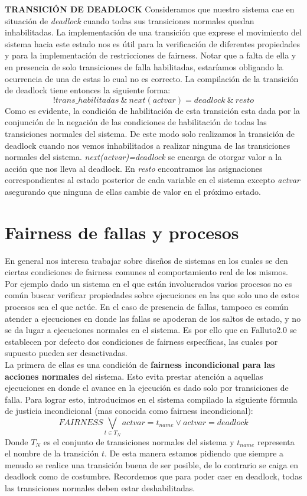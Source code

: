 \documentclass[titlepage, 12pt]{book}
\begin{document}
\textbf{TRANSICI\'ON DE DEADLOCK}
Consideramos que nuestro sistema cae en situaci\'on de \textit{deadlock} cuando todas sus transiciones normales quedan inhabilitadas. La implementaci\'on de una transici\'on que exprese el movimiento del sistema hacia este estado nos es \'util para la verificaci\'on de diferentes propiedades y para la implementaci\'on de restricciones de fairness. Notar que a falta de ella y en presencia de solo transiciones de falla habilitadas, estar\'iamos obligando la ocurrencia de una de estas lo cual no es correcto. La compilaci\'on de la transici\'on de deadlock tiene entonces la siguiente forma:
$$!trans\_habilitadas~\&~next(actvar)=deadlock~\&~resto$$
Como es evidente, la condici\'on de habilitaci\'on de esta transici\'on esta dada por la conjunci\'on de la negaci\'on de las condiciones de habilitaci\'on de todas las transiciones normales del sistema. De este modo solo realizamos la transici\'on de deadlock cuando nos vemos inhabilitados a realizar ninguna de las transiciones normales del sistema. \textit{next(actvar)=deadlock} se encarga de otorgar valor a la acci\'on que nos lleva al deadlock. En \textit{resto} encontramos las asignaciones correspondientes al estado posterior de cada variable en el sistema excepto \textit{actvar} asegurando que ninguna de ellas cambie de valor en el pr\'oximo estado.



\section{Fairness de fallas y procesos}
En general nos interesa trabajar sobre diseños de sistemas en los cuales se den ciertas condiciones de fairness comunes al comportamiento real de los mismos. Por ejemplo dado un sistema en el que est\'an involucrados varios procesos no es com\'un buscar verificar propiedades sobre ejecuciones en las que solo uno de estos procesos sea el que act\'ue. En el caso de presencia de fallas, tampoco es com\'un atender a ejecuciones en donde las fallas se apoderan de los saltos de estado, y no se da lugar a ejecuciones normales en el sistema. Es por ello que en Falluto2.0 se establecen por defecto dos condiciones de fairness espec\'ificas, las cuales por supuesto pueden ser desactivadas.\\

La primera de ellas es una condici\'on de \textbf{fairness incondicional para las acciones normales} del sistema. Esto evita prestar atenci\'on a aquellas ejecuciones en donde el avance en la ejecuci\'on es dado solo por transiciones de falla. Para lograr esto, introducimos en el sistema compilado la siguiente f\'ormula de justicia incondicional (mas conocida como fairness incondicional):
$$FAIRNESS \bigvee_{t \in T_N} actvar = t_{name} \vee actvar = deadlock$$
Donde $T_N$ es el conjunto de transiciones normales del sistema y $t_{name}$ representa el nombre de la transici\'on $t$. De esta manera estamos pidiendo que siempre a menudo se realice una transici\'on buena de ser posible, de lo contrario se caiga en deadlock como de costumbre. Recordemos que para poder caer en deadlock, todas las transiciones normales deben estar deshabilitadas.\\
\end{document}

